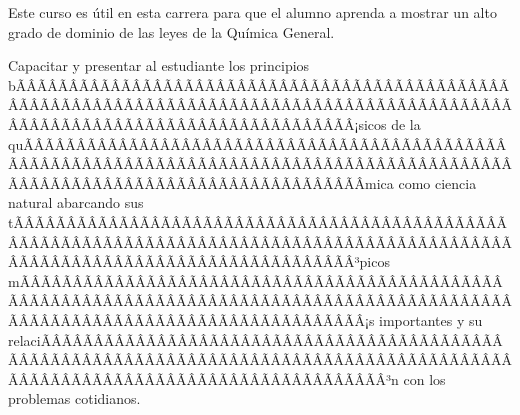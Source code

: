 \begin{sumilla}


\begin{fundamentacion}
Este curso es \'util en esta carrera para que el alumno aprenda a mostrar un alto grado de dominio de las leyes de la Qu\'imica General.
\end{fundamentacion}

\begin{objetivosdelcurso}
\item Capacitar y presentar al estudiante los principios bÃÂÃÂÃÂÃÂÃÂÃÂÃÂÃÂÃÂÃÂÃÂÃÂÃÂÃÂÃÂÃÂÃÂÃÂÃÂÃÂÃÂÃÂÃÂÃÂÃÂÃÂÃÂÃÂÃÂÃÂÃÂÃÂÃÂÃÂÃÂÃÂÃÂÃÂÃÂÃÂÃÂÃÂÃÂÃÂÃÂÃÂÃÂÃÂÃÂÃÂÃÂÃÂÃÂÃÂÃÂÃÂÃÂÃÂÃÂÃÂÃÂÃÂÃÂÃÂ¡sicos de la quÃÂÃÂÃÂÃÂÃÂÃÂÃÂÃÂÃÂÃÂÃÂÃÂÃÂÃÂÃÂÃÂÃÂÃÂÃÂÃÂÃÂÃÂÃÂÃÂÃÂÃÂÃÂÃÂÃÂÃÂÃÂÃÂÃÂÃÂÃÂÃÂÃÂÃÂÃÂÃÂÃÂÃÂÃÂÃÂÃÂÃÂÃÂÃÂÃÂÃÂÃÂÃÂÃÂÃÂÃÂÃÂÃÂÃÂÃÂÃÂÃÂÃÂÃÂÃÂ­mica como ciencia natural abarcando sus tÃÂÃÂÃÂÃÂÃÂÃÂÃÂÃÂÃÂÃÂÃÂÃÂÃÂÃÂÃÂÃÂÃÂÃÂÃÂÃÂÃÂÃÂÃÂÃÂÃÂÃÂÃÂÃÂÃÂÃÂÃÂÃÂÃÂÃÂÃÂÃÂÃÂÃÂÃÂÃÂÃÂÃÂÃÂÃÂÃÂÃÂÃÂÃÂÃÂÃÂÃÂÃÂÃÂÃÂÃÂÃÂÃÂÃÂÃÂÃÂÃÂÃÂÃÂÃÂ³picos mÃÂÃÂÃÂÃÂÃÂÃÂÃÂÃÂÃÂÃÂÃÂÃÂÃÂÃÂÃÂÃÂÃÂÃÂÃÂÃÂÃÂÃÂÃÂÃÂÃÂÃÂÃÂÃÂÃÂÃÂÃÂÃÂÃÂÃÂÃÂÃÂÃÂÃÂÃÂÃÂÃÂÃÂÃÂÃÂÃÂÃÂÃÂÃÂÃÂÃÂÃÂÃÂÃÂÃÂÃÂÃÂÃÂÃÂÃÂÃÂÃÂÃÂÃÂÃÂ¡s importantes y su relaciÃÂÃÂÃÂÃÂÃÂÃÂÃÂÃÂÃÂÃÂÃÂÃÂÃÂÃÂÃÂÃÂÃÂÃÂÃÂÃÂÃÂÃÂÃÂÃÂÃÂÃÂÃÂÃÂÃÂÃÂÃÂÃÂÃÂÃÂÃÂÃÂÃÂÃÂÃÂÃÂÃÂÃÂÃÂÃÂÃÂÃÂÃÂÃÂÃÂÃÂÃÂÃÂÃÂÃÂÃÂÃÂÃÂÃÂÃÂÃÂÃÂÃÂÃÂÃÂ³n con los problemas cotidianos.
\end{objetivosdelcurso}

\begin{outcomes}
\end{outcomes}


\end{sumilla}

